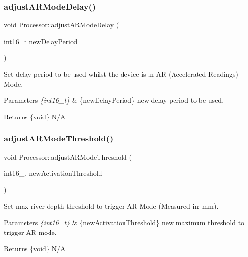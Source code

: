 \subsubsection{\texorpdfstring{adjust\+A\+R\+Mode\+Delay()}{adjustARModeDelay()}}
{\footnotesize\ttfamily void Processor\+::adjust\+A\+R\+Mode\+Delay (\begin{DoxyParamCaption}\item[{int16\+\_\+t}]{new\+Delay\+Period }\end{DoxyParamCaption})}

Set delay period to be used whilst the device is in AR (Accelerated Readings) Mode. 
\begin{DoxyParams}{Parameters}
{\em \{int16\+\_\+t\}} & \{new\+Delay\+Period\} new delay period to be used. \\
\hline
\end{DoxyParams}
\begin{DoxyReturn}{Returns}
\{void\} N/A 
\end{DoxyReturn}
\mbox{\label{class_processor_a58a2f6a482491cb003f4ff1bd45ba891}} 
\subsubsection{\texorpdfstring{adjust\+A\+R\+Mode\+Threshold()}{adjustARModeThreshold()}}
{\footnotesize\ttfamily void Processor\+::adjust\+A\+R\+Mode\+Threshold (\begin{DoxyParamCaption}\item[{int16\+\_\+t}]{new\+Activation\+Threshold }\end{DoxyParamCaption})}

Set max river depth threshold to trigger AR Mode (Measured in\+: mm). 
\begin{DoxyParams}{Parameters}
{\em \{int16\+\_\+t\}} & \{new\+Activation\+Threshold\} new maximum threshold to trigger AR mode. \\
\hline
\end{DoxyParams}
\begin{DoxyReturn}{Returns}
\{void\} N/A 
\end{DoxyReturn}
\mbox{\label{class_processor_a4b4e65040fd7bc17e978412c1af8e0c8}} 
